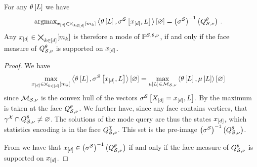 \begin{theorem}
    \label{the:modeQueryFaceBM}
    For any $\theta\left[L\right]$ we have
    \begin{align*}
        \mathrm{argmax}_{x_{[d]}\in\bigtimes_{k\in[d]}[m_{k}]} \left\langle \theta\left[L\right],\sigma^{\mathcal{S}}\left[x_{[d]},L\right]\right\rangle \left[ \varnothing \right] =
        \left(\sigma^{\mathcal{S}}\right)^{-1}\left(Q^{\theta}_{\mathcal{S},\nu}\right) \, .
    \end{align*}
    Any $x_{[d]}\in\bigtimes_{k\in[d]}[m_{k}]$ is therefore a mode of $\mathbb{P}^{\mathcal{S},\theta,\nu}$, if and only if the face measure of $Q^{\theta}_{\mathcal{S},\nu}$ is supported on $x_{[d]}$.
\end{theorem}
\begin{proof}
    We have
    \begin{align*}
        \max_{x_{[d]}\in\bigtimes_{k\in[d]}[m_{k}]} \left\langle \theta\left[L\right],\sigma^{\mathcal{S}}\left[x_{[d]},L\right]\right\rangle \left[ \varnothing \right] =
        \max_{\mu\left[L\right]\in\mathcal{M}_{\mathcal{S},\nu}} \left\langle \theta\left[L\right],\mu\left[L\right]\right\rangle \left[ \varnothing \right]
    \end{align*}
    since $\mathcal{M}_{\mathcal{S},\nu}$ is the convex hull of the vectors $\sigma^{\mathcal{S}}\left[X_{[d]}=x_{[d]},L\right]$.
    By  the maximum is taken at the face $Q^{\theta}_{\mathcal{S},\nu}$.
    We further have, since any face contains vertices, that $\gamma^{\mathcal{X}}\cap Q^{\theta}_{\mathcal{S},\nu}\neq\varnothing$.
    The solutions of the mode query are thus the states $x_{[d]}$, which statistics encoding is in the face $Q^{\mathcal{I}}_{\mathcal{S},\nu}$.
    This set is the pre-image $\left(\sigma^{\mathcal{S}}\right)^{-1}\left(Q^{\theta}_{\mathcal{S},\nu}\right)$.

    From  we have that $x_{[d]}\in\left(\sigma^{\mathcal{S}}\right)^{-1}\left(Q^{\theta}_{\mathcal{S},\nu}\right)$ if and only if the face measure of $Q^{\theta}_{\mathcal{S},\nu}$ is supported on $x_{[d]}$.
\end{proof}

